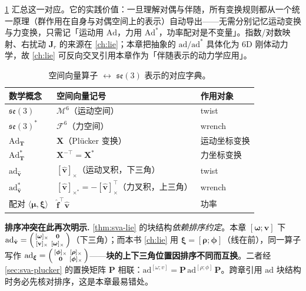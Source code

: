 \cref{tab:sva-lie-dict} 汇总这一对应。它的实践价值：一旦理解对偶与伴随，所有变换规则都从一个统一原理（群作用在自身与对偶空间上的表示）自动导出——无需分别记忆运动变换与力变换，只需记「运动用 $\mathrm{Ad}$，力用 $\mathrm{Ad}^*$，功率配对是不变量」。指数/对数映射、右扰动 $\mathbf J_r$ 的来源在 \cref{ch:lie}；本章把抽象的 $\mathrm{ad}/\mathrm{ad}^*$ 具体化为 6D 刚体动力学，故 \cref{ch:lie} 可反向交叉引用本章作为「伴随表示的动力学应用」。

\begin{table}[H]\centering\small
\caption{空间向量算子 $\leftrightarrow$ $\mathfrak{se}(3)$ 表示的对应字典。}
\label{tab:sva-lie-dict}
\begin{tabular}{lll}
\toprule
数学概念 & 空间向量记号 & 作用对象 \\
\midrule
$\mathfrak{se}(3)$ & $\mathcal M^6$（运动空间） & twist \\
$\mathfrak{se}(3)^*$ & $\mathcal F^6$（力空间） & wrench \\
$\mathrm{Ad}_{\mathbf T}$ & $\mathbf X$（Plücker 变换） & 运动坐标变换 \\
$\mathrm{Ad}^*_{\mathbf T}$ & $\mathbf X^{-\top}=\mathbf X^*$ & 力坐标变换 \\
$\mathrm{ad}_{\hat{\mathbf v}}$ & $[\hat{\mathbf v}]_\times$（运动叉积，下三角） & twist \\
$\mathrm{ad}^*_{\hat{\mathbf v}}$ & $[\hat{\mathbf v}]_{\times^*}=-[\hat{\mathbf v}]_\times^\top$（力叉积，上三角） & wrench \\
配对 $\langle\boldsymbol\mu,\boldsymbol\xi\rangle$ & $\hat{\mathbf f}^\top\hat{\mathbf v}$ & 功率 \\
\bottomrule
\end{tabular}
\end{table}

\begin{note}
\textbf{排序冲突在此再次明示.}\;
\cref{thm:sva-lie} 的块结构\emph{依赖排序约定}。本章 $[\boldsymbol\omega;\mathbf v]$ 下 $\mathrm{ad}_{\hat{\mathbf v}}=\begin{psmallmatrix}[\boldsymbol\omega]_\times&\mathbf 0\\ [\mathbf v]_\times&[\boldsymbol\omega]_\times\end{psmallmatrix}$（下三角）；而本书 \cref{ch:lie} 用 $\boldsymbol\xi=[\boldsymbol\rho;\boldsymbol\phi]$（线在前），同一算子写作 $\mathrm{ad}_{\boldsymbol\xi}=\begin{psmallmatrix}[\boldsymbol\phi]_\times&[\boldsymbol\rho]_\times\\ \mathbf 0&[\boldsymbol\phi]_\times\end{psmallmatrix}$——\textbf{块的上下三角位置因排序不同而互换}。二者经 \cref{sec:sva-plucker} 的置换矩阵 $\mathbf P$ 相联：$\mathrm{ad}^{[\omega;v]}=\mathbf P\,\mathrm{ad}^{[\rho;\phi]}\,\mathbf P$。跨章引用 $\mathrm{ad}$ 块结构时务必先核对排序，这是本章最易错处。
\end{note}

